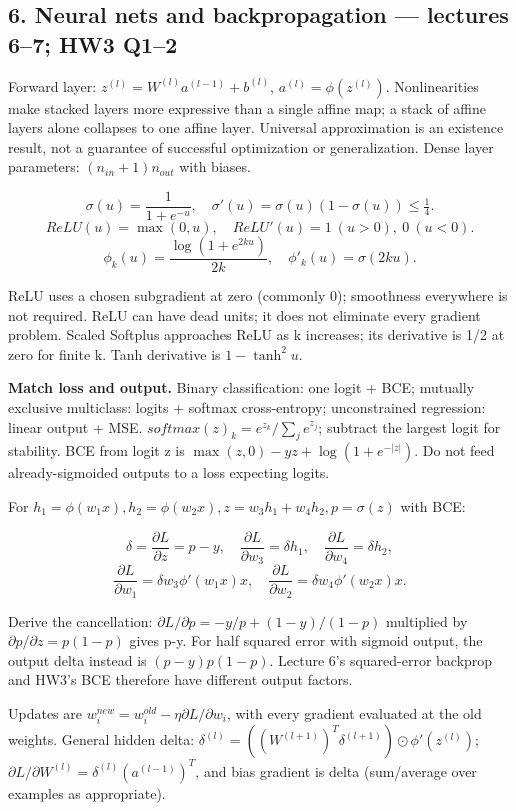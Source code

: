 \documentclass[11pt]{article}
\begin{document}
\subsection*{6. Neural nets and backpropagation — lectures 6–7; HW3 Q1–2}

Forward layer: $z^{(l)}=W^{(l)}a^{(l-1)}+b^{(l)}$, $a^{(l)}=\phi(z^{(l)})$. Nonlinearities make stacked layers more expressive than a single affine map; a stack of affine layers alone collapses to one affine layer. Universal approximation is an existence result, not a guarantee of successful optimization or generalization. Dense layer parameters: $(n_{in}+1)n_{out}$ with biases.

\[
\sigma(u)=\frac1{1+e^{-u}},\quad \sigma'(u)=\sigma(u)(1-\sigma(u))\le\tfrac14.
\]
\[
ReLU(u)=\max(0,u),\quad ReLU'(u)=1\ (u>0),\ 0\ (u<0).
\]
\[
\phi_k(u)=\frac{\log(1+e^{2ku})}{2k},\quad \phi'_k(u)=\sigma(2ku).
\]

ReLU uses a chosen subgradient at zero (commonly 0); smoothness everywhere is not required. ReLU can have dead units; it does not eliminate every gradient problem. Scaled Softplus approaches ReLU as k increases; its derivative is 1/\allowbreak{}2 at zero for finite k. Tanh derivative is $1-\tanh^2u$.

\textbf{Match loss and output.} Binary classification: one logit + BCE; mutually exclusive multiclass: logits + softmax cross-entropy; unconstrained regression: linear output + MSE. $softmax(z)_k=e^{z_k}/\sum_je^{z_j}$; subtract the largest logit for stability. BCE from logit z is $\max(z,0)-yz+\log(1+e^{-|z|})$. Do not feed already-sigmoided outputs to a loss expecting logits.

For $h_1=\phi(w_1x),h_2=\phi(w_2x),z=w_3h_1+w_4h_2,p=\sigma(z)$ with BCE:

\[
\delta=\frac{\partial L}{\partial z}=p-y,\quad
\frac{\partial L}{\partial w_3}=\delta h_1,\quad
\frac{\partial L}{\partial w_4}=\delta h_2,
\]
\[
\frac{\partial L}{\partial w_1}=\delta w_3\phi'(w_1x)x,\quad
\frac{\partial L}{\partial w_2}=\delta w_4\phi'(w_2x)x.
\]

Derive the cancellation: $\partial L/\partial p=-y/p+(1-y)/(1-p)$ multiplied by $\partial p/\partial z=p(1-p)$ gives p-y. For half squared error with sigmoid output, the output delta instead is $(p-y)p(1-p)$. Lecture 6's squared-error backprop and HW3's BCE therefore have different output factors.

Updates are $w_i^{new}=w_i^{old}-\eta\partial L/\partial w_i$, with every gradient evaluated at the old weights. General hidden delta: $\delta^{(l)}=((W^{(l+1)})^T\delta^{(l+1)})\odot\phi'(z^{(l)})$; $\partial L/\partial W^{(l)}=\delta^{(l)}(a^{(l-1)})^T$, and bias gradient is delta (sum/\allowbreak{}average over examples as appropriate).
\end{document}
